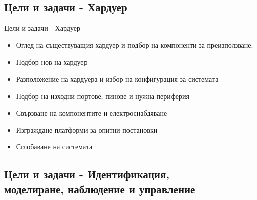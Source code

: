 \documentclass[handout]{beamer}
\begin{document}
\subsection{Цели и задачи - Хардуер}


\begin{frame}{Цели и задачи - Хардуер}
	\begin{itemize}
		\pause 
		\item Оглед на съществуващия хардуер и подбор на компоненти за преизползване.

		\pause 
		\item Подбор нов на хардуер

		\pause 
		\item Разположение на хардуера и избор на конфигурация за системата 

		\pause 
		\item Подбор на изходни портове, пинове и нужна периферия

		\pause
		\item Свързване на компонентите и електроснабдяване

		\pause 
		\item Изграждане платформи за опитни постановки

		\pause 
		\item Сглобаване на системата

	\end{itemize}
\end{frame}

\subsection{Цели и задачи - Идентификация,\\ моделиране, наблюдение и управление}
\end{document}

